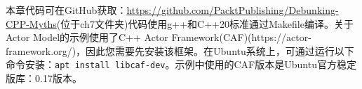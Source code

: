 本章代码可在GitHub获取：\url{https://github.com/PacktPublishing/Debunking-CPP-Myths}(位于ch7文件夹)代码使用g++和C++20标准通过Makefile编译。关于Actor Model的示例使用了C++ Actor Framework(CAF)(https://actor-framework.org/)，因此您需要先安装该框架。在Ubuntu系统上，可通过运行以下命令安装：\verb|apt install libcaf-dev|。示例中使用的CAF版本是Ubuntu官方稳定版库：0.17版本。